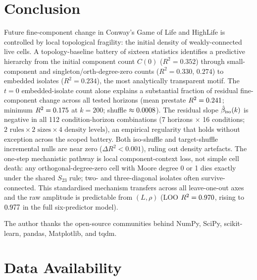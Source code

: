\documentclass[aip,cha,preprint,nofootinbib]{revtex4-2}
\newcommand{\topCompCountR}{0.352}
\newcommand{\topSmallLeqFourR}{0.330}
\newcommand{\topSingletonR}{0.274}
\newcommand{\topIsoEmbeddedR}{0.234}
\newcommand{\iso}{{\rm iso}}
\newcommand{\biso}{\hat{\beta}_{\iso}}
\begin{document}
\section{Conclusion}
\label{sec:conclusion}

Future fine-component change in Conway's Game of Life and HighLife is
controlled by local topological fragility: the initial density of
weakly-connected live cells.
A topology-baseline battery of sixteen statistics identifies a predictive
hierarchy from the initial component count $C(0)$ ($R^2 = \topCompCountR$)
through small-component and singleton/orth-degree-zero counts
($R^2 = \topSmallLeqFourR$, $\topSingletonR$) to embedded isolates
($R^2 = \topIsoEmbeddedR$), the most analytically transparent motif.
The $t=0$ embedded-isolate count alone explains a substantial fraction of
residual fine-component change across all tested horizons
(mean prestate $R^2 = 0.241$; minimum $R^2 = 0.175$
at $k=200$; shuffle $\approx 0.0008$).
The residual slope $\biso(k)$ is negative in all 112 condition-horizon
combinations (7 horizons $\times$ 16 conditions;
$2 \text{ rules} \times 2 \text{ sizes} \times 4 \text{ density levels}$),
an empirical regularity that holds without exception across the scoped battery.
Both iso-shuffle and target-shuffle incremental nulls are near zero
($\Delta R^2 < 0.001$), ruling out density artefacts.
The one-step mechanistic pathway is local component-context loss, not simple cell
death: any orthogonal-degree-zero cell with Moore degree 0 or 1 dies exactly
under the shared $S_{23}$ rule; two- and three-diagonal isolates often
survive-connected.
This standardised mechanism transfers across all leave-one-out axes
and the raw amplitude is predictable from $(L,\rho)$
(LOO $R^2 = 0.970$, rising to $0.977$ in the full
six-predictor model).

\begin{acknowledgments}
The author thanks the open-source communities behind NumPy, SciPy,
scikit-learn, pandas, Matplotlib, and tqdm.
\end{acknowledgments}

\section*{Data Availability}
\end{document}
